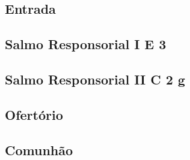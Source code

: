 
\subsection{Entrada}\label{subsection:hebdomada-sancta/missa-chrismatis/introitus}

\AllowPageFlush

\subsection[Salmo Responsorial I]{Salmo Responsorial I \textmd{E 3}}\label{subsection:hebdomada-sancta/missa-chrismatis/psalmus-responsorius-1}

\AllowPageFlush

\subsection[Salmo Responsorial II]{Salmo Responsorial II \textmd{C 2 g}}\label{subsection:hebdomada-sancta/missa-chrismatis/psalmus-responsorius-2}

\AllowPageFlush

\subsection{Ofertório}\label{subsection:hebdomada-sancta/missa-chrismatis/offertorium}

\AllowPageBreak

\subsection{Comunhão}\label{subsection:hebdomada-sancta/missa-chrismatis/communio}

